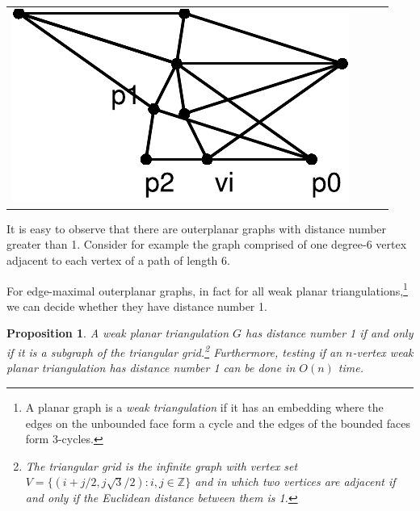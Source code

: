 \documentclass{article}
\newtheorem{prop}{Proposition}
\begin{document}
\begin{tabular}{cccc}
\includegraphics[scale=.30]{no2-4} 
\end{tabular}

It is easy to observe that there are outerplanar graphs with distance
number greater than 1.  Consider for example the graph comprised of
one degree-6 vertex adjacent to each vertex of a path of length 6. 


For edge-maximal outerplanar graphs, in fact for all weak planar
triangulations,\footnote{A planar graph is a \emph{weak triangulation}
if it has an embedding where the edges on the unbounded face form a
cycle and the edges of the bounded faces form 3-cycles.} we can decide
whether they have distance number 1.

\begin{prop} 
A weak planar triangulation $G$ has distance number 1 if and only if
it is a subgraph of the triangular grid.\footnote{The triangular grid
is the infinite graph with vertex set $V=\{(i+j/2,j\sqrt{3}/2):
i,j\in\mathbb{Z}\}$ and in which two vertices are adjacent if and only
if the Euclidean distance between them is 1.\label{fna}}  Furthermore,
testing if an $n$-vertex weak planar triangulation has distance number
1 can be done in $O(n)$ time.  
\end{prop}
\end{document}
